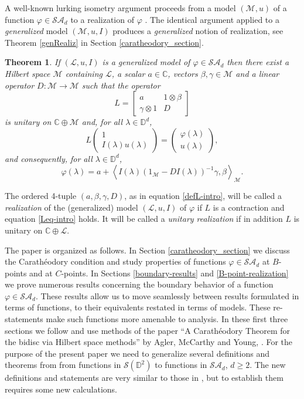 \documentclass[11pt, reqno]{amsart}
\newtheorem{theorem}{Theorem}[section]
\newcommand\1{\boldsymbol {1}}
\newcommand{\sad}{\mathcal{SA}_d}
\renewcommand{\L}{\mathcal{L}}
\newcommand{\M}{\mathcal{M}}
\newcommand{\D}{\mathbb{D}}
\newcommand{\C}{\mathbb{C}}
\newcommand{\ip}[2]{\left\langle #1, #2 \right\rangle}
\newcommand{\vp}{\varphi}
\newcommand{\ph}{\varphi}
\newcommand\ga{\gamma}
\newcommand\la{\lambda}
\newcommand\beq{\begin{equation}}
\newcommand\eeq{\end{equation}}
\newcommand{\vectwo}[2]
{
   \begin{pmatrix} #1 \\ #2 \end{pmatrix}
}
\numberwithin{equation}{section}
\begin{document}
 
A well-known lurking isometry argument proceeds from a model $(\M,u)$ of a function $\ph\in \sad$ to a realization of $\ph$ \cite{Ag1}.  The identical argument applied to a {\em generalized} model $(\M, u, I)$ produces a {\em generalized} notion of realization, see Theorem \ref{genRealiz} in Section \ref{caratheodory_section}.
\begin{theorem} \label{genRealiz-intro}
 If $(\L, u, I)$ is a generalized model of $\vp \in \sad$ then there exist a Hilbert space $\M$ containing $\L$, a scalar $a \in \C$, vectors $\beta, \gamma \in \M$ and a linear operator $D:\M \to \M$ such that the operator
\beq \label{defL-intro}
L =  \begin{bmatrix}
  a & 1 \otimes \beta \\
  \gamma \otimes 1 & D
 \end{bmatrix}
\eeq
is unitary on $\C \oplus \M$ and, for all $\lambda \in \D^d$, 
\beq\label{Leq-intro}
 L \vectwo{1}{I(\lambda)u(\lambda)} = \vectwo{\vp(\lambda)}{u(\lambda)},
\eeq
and consequently, for all $\la\in\D^d$,
\beq\label{formphi-intro}
\ph(\la) = a+ \ip{I(\la)(1_{\M}-DI(\la))^{-1}\ga}{\beta}_{\M}.
\eeq
\end{theorem}
The ordered 4-tuple $(a, \beta, \gamma, D)$, as  in equation \eqref{defL-intro}, will be called a {\em realization} of the (generalized) model $(\L, u, I)$ of $\ph$ if $L$ is a contraction and equation \eqref{Leq-intro} holds.  It will be called a {\em unitary realization} if in addition $L$ is unitary on $\C\oplus \L$. 
 
The paper is organized as follows. 
In Section \ref{caratheodory_section} we discuss the Carath\'eodory condition and study properties of functions $\varphi \in \mathcal{SA}_{d}$ at $B$-points and at $C$-points. 
In Sections \ref{boundary-results} and \ref{B-point-realization}
we prove   numerous results concerning the boundary behavior of a function $\varphi \in \mathcal{SA}_{d}$. These results allow us to move seamlessly between results formulated in terms of functions, to their equivalents restated in terms of models. These re-statements make such functions more amenable to analysis. 
In these first three sections we follow and use methods of the paper ``A Carath\'{e}odory Theorem for the bidisc via Hilbert space methods'' by Agler, McCarthy and Young, \cite{AMYcara}. 
For the purpose of the present paper we need to generalize several definitions and theorems from \cite{AMYcara} from functions in $\mathcal{S}(\D^2)$ to functions in $\mathcal{SA}_{d}$, $d\geq 2$. The new definitions and statements are very similar to those in \cite{AMYcara}, but to establish them requires some new calculations.
\end{document}
